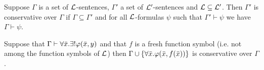 \begin{boxdef}
\begin{defi}
    Suppose $\Gamma$ is a set of $\mathcal{L}$-sentences, $\Gamma'$ a set of $\mathcal{L}'$-sentences and $\mathcal{L} \subseteq \mathcal{L}'$.
    Then \alert{$\Gamma'$ is conservative over $\Gamma$} if $\Gamma \subseteq \Gamma'$ and for all $\mathcal{L}$-formulas $\psi$ such that $\Gamma' \vdash \psi$ we have $\Gamma \vdash \psi$. 
\end{defi}
\end{boxdef}

\begin{boxthe}
\begin{thm}
    Suppose that $\Gamma \vdash \forall \bar{x}. \exists! \varphi(\bar{x}, y)$ and that $f$ is a fresh function symbol (i.e. not among the function symbols of $\mathcal{L}$) then $\Gamma \cup \{\forall \bar{x}. \varphi(\bar{x}, f(\bar{x}))\}$ is conservative over $\Gamma$.
\end{thm}
\end{boxthe}

